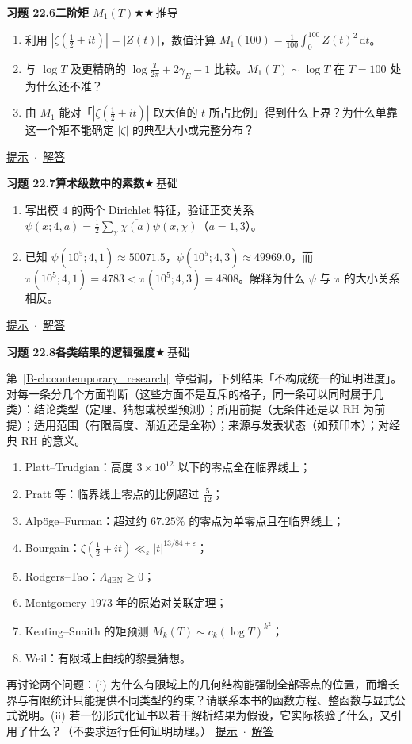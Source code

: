 \documentclass[11pt,a4paper]{article}
\newcommand{\dd}{\,\mathrm{d}}
\newcommand{\bref}[1]{\ref*{B-#1}}
\newcommand{\lvI}{$\bigstar$\,基础}
\newcommand{\lvII}{$\bigstar\bigstar$\,推导}
\newcommand{\Q}[3]{%
  \par\addvspace{1.1em}\noindent
  \hypertarget{q:#1}{}\textbf{习题 #1}\quad\textbf{#3}\hfill{\small #2}\par
  \nopagebreak\smallskip}
\newcommand{\toHint}[1]{\hfill{\small\hyperlink{h:#1}{提示}\ $\cdot$\ \hyperlink{s:#1}{解答}}}
\begin{document}
\Q{22.6}{\lvII}{二阶矩 $M_1(T)$}
\begin{enumerate}
  \item 利用 $|\zeta(\frac12+it)|=|Z(t)|$，数值计算 $M_1(100)=\frac1{100}\int_0^{100}Z(t)^2\dd t$。
  \item 与 $\log T$ 及更精确的 $\log\frac T{2\pi}+2\gamma_E-1$ 比较。$M_1(T)\sim\log T$ 在 $T=100$ 处为什么还不准？
  \item 由 $M_1$ 能对「$|\zeta(\frac12+it)|$ 取大值的 $t$ 所占比例」得到什么上界？为什么单靠这一个矩不能确定 $|\zeta|$ 的典型大小或完整分布？
\end{enumerate}
\toHint{22.6}

\Q{22.7}{\lvI}{算术级数中的素数}
\begin{enumerate}
  \item 写出模 $4$ 的两个 Dirichlet 特征，验证正交关系 $\psi(x;4,a)=\frac12\sum_\chi\overline{\chi(a)}\psi(x,\chi)$（$a=1,3$）。
  \item 已知 $\psi(10^5;4,1)\approx50071.5$，$\psi(10^5;4,3)\approx49969.0$，而 $\pi(10^5;4,1)=4783<\pi(10^5;4,3)=4808$。解释为什么 $\psi$ 与 $\pi$ 的大小关系相反。
\end{enumerate}
\toHint{22.7}

\Q{22.8}{\lvI}{各类结果的逻辑强度}
第~\bref{ch:contemporary_research}~章强调，下列结果「不构成统一的证明进度」。对每一条分几个方面判断（这些方面不是互斥的格子，同一条可以同时属于几类）：结论类型（定理、猜想或模型预测）；所用前提（无条件还是以 RH 为前提）；适用范围（有限高度、渐近还是全称）；来源与发表状态（如预印本）；对经典 RH 的意义。
\begin{enumerate}
  \item Platt--Trudgian：高度 $3\times10^{12}$ 以下的零点全在临界线上；
  \item Pratt 等：临界线上零点的比例超过 $\frac5{12}$；
  \item Alp\"oge--Furman：超过约 $67.25\%$ 的零点为单零点且在临界线上；
  \item Bourgain：$\zeta(\frac12+it)\ll_\varepsilon|t|^{13/84+\varepsilon}$；
  \item Rodgers--Tao：$\Lambda_{\mathrm{dBN}}\ge0$；
  \item Montgomery 1973 年的原始对关联定理；
  \item Keating--Snaith 的矩预测 $M_k(T)\sim c_k(\log T)^{k^2}$；
  \item Weil：有限域上曲线的黎曼猜想。
\end{enumerate}
再讨论两个问题：(i) 为什么有限域上的几何结构能强制全部零点的位置，而增长界与有限统计只能提供不同类型的约束？请联系本书的函数方程、整函数与显式公式说明。(ii) 若一份形式化证书以若干解析结果为假设，它实际核验了什么，又引用了什么？（不要求运行任何证明助理。）
\toHint{22.8}
\end{document}
